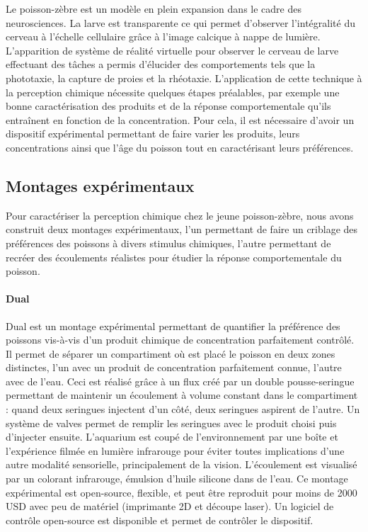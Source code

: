 Le poisson-zèbre est un modèle en plein expansion dans le cadre des neurosciences. La larve est transparente ce qui permet d'observer l'intégralité du cerveau à l'échelle cellulaire grâce à l'image calcique à nappe de lumière. L'apparition de système de réalité virtuelle pour observer le cerveau de larve effectuant des tâches a permis d'élucider des comportements tels que la phototaxie, la capture de proies et la rhéotaxie. L'application de cette technique à la perception chimique nécessite quelques étapes préalables, par exemple une bonne caractérisation des produits et de la réponse comportementale qu'ils entraînent en fonction de la concentration. Pour cela, il est nécessaire d'avoir un dispositif expérimental permettant de faire varier les produits, leurs concentrations ainsi que l'âge du poisson tout en caractérisant leurs préférences.

\subsection*{Montages expérimentaux}
Pour caractériser la perception chimique chez le jeune poisson-zèbre, nous avons construit deux montages expérimentaux, l'un permettant de faire un criblage des préférences des poissons à divers stimulus chimiques, l'autre permettant de recréer des écoulements réalistes pour étudier la réponse comportementale du poisson.

\paragraph{Dual} Dual est un montage expérimental permettant de quantifier la préférence des poissons vis-à-vis d'un produit chimique de concentration parfaitement contrôlé. Il permet de séparer un compartiment où est placé le poisson en deux zones distinctes, l'un avec un produit de concentration parfaitement connue, l'autre avec de l'eau. Ceci est réalisé grâce à un flux créé par un double pousse-seringue permettant de maintenir un écoulement à volume constant dans le compartiment : quand deux seringues injectent d'un côté, deux seringues aspirent de l'autre. Un système de valves permet de remplir les seringues avec le produit choisi puis d'injecter ensuite. L'aquarium est coupé de l'environnement par une boîte et l'expérience filmée en lumière infrarouge pour éviter toutes implications d'une autre modalité sensorielle, principalement de la vision. L'écoulement est visualisé par un colorant infrarouge, émulsion d'huile silicone dans de l'eau. Ce montage expérimental est open-source, flexible, et peut être reproduit pour moins de 2000 USD avec peu de matériel (imprimante 2D et découpe laser). Un logiciel de contrôle open-source est disponible et permet de contrôler le dispositif.

